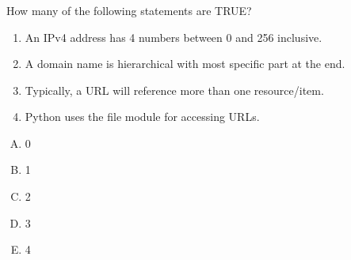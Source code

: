 \documentclass[xcolor=svgnames]{beamer}
\newcommand{\ft}[1]{\frametitle{#1}}
\begin{document}
%
%
%







\begin{frame}[fragile]\ft{}
  \begin{example}
How many of the following statements are TRUE?
\begin{enumerate}
\item {{An IPv4 address has 4 numbers between 0 and 256 inclusive.}}
\item {{A domain name is hierarchical with most specific part at the end.}}
\item {{Typically, a URL will reference more than one resource/item.}}
\item {{Python uses the file module for accessing URLs.}} 
\end{enumerate}
\begin{multicols}{5}
\begin{enumerate}[A)]
\item 0 
\item 1
\item 2
\item 3
\item 4
\end{enumerate}
\end{multicols}
  \end{example} 
\end{frame}


\end{document}
